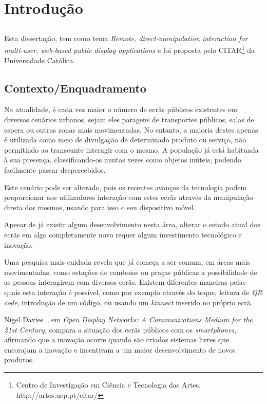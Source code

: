 \chapter{Introdução} \label{chap:intro}

\section*{}
 
Esta dissertação, tem como tema \textit{Remote, direct-manipulation interaction for multi-user, web-based public display applications} e foi proposta pelo CITAR\footnote{Centro de Investigação em Ciência e Tecnologia das Artes, http://artes.ucp.pt/citar/} da Universidade Católica.  

\section{Contexto/Enquadramento} \label{sec:context}

Na atualidade, é cada vez maior o número de ecrãs públicos existentes em diversos cenários urbanos, sejam eles paragens de transportes públicos, salas de espera ou outras zonas mais movimentadas. No entanto, a maioria destes apenas é utilizada como meio de divulgação de determinado produto ou serviço, não permitindo ao transeunte interagir com o mesmo. A população já está habituada à sua presença, classificando-os muitas vezes como objetos inúteis, podendo facilmente passar despercebidos. 

Este cenário pode ser alterado, pois os recentes avanços da tecnologia podem proporcionar aos utilizadores interação com estes ecrãs através da manipulação direta dos mesmos, usando para isso o seu dispositivo móvel.

Apesar de já existir algum desenvolvimento nesta área, alterar o estado atual dos ecrãs em algo completamente novo requer algum investimento tecnológico e inovação.

Uma pesquisa mais cuidada revela que já começa a ser comum, em áreas mais movimentadas, como estações de comboios ou praças públicas a possibilidade de as pessoas interagirem com diversos ecrãs. Existem diferentes maneiras pelas quais esta interação é possível, como por exemplo através do toque, leitura de \textit{QR code}, introdução de um código, ou usando um \textit{kinnect} inserido no próprio ecrã. 

Nigel Davies~\cite{Davies2012b}, em \textit{Open Display Networks: A Communications Medium for the 21st Century}, compara a situação dos ecrãs públicos com os \textit{smartphones}, afirmando que a inovação ocorre quando são criados sistemas livres que encorajam a inovação e incentivam a um maior desenvolvimento de novos produtos.

